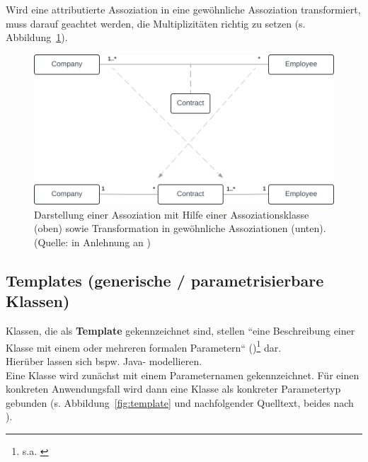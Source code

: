 \noindent
Wird eine attributierte Assoziation in eine gewöhnliche Assoziation transformiert, muss darauf geachtet werden, die Multiplizitäten richtig zu setzen (s. Abbildung~\ref{fig:assoziationsklasse}).

\begin{figure}
    \centering
    \includegraphics[scale=0.4]{part three/Klassendiagramme - Erweiterte Konzepte und Paketdiagramme/img/assoziationsklasse}
    \caption{Darstellung einer Assoziation mit Hilfe einer Assoziationsklasse (oben) sowie Transformation in gewöhnliche Assoziationen (unten). (Quelle: in Anlehnung an \cite[279, Abb. 4.4-11]{Oes05})}
    \label{fig:assoziationsklasse}
\end{figure}

\subsection{Templates (generische / parametrisierbare Klassen)}
Klassen, die als \textbf{Template} gekennzeichnet sind, stellen ``eine Beschreibung einer Klasse mit einem oder mehreren formalen Parametern`` (\cite[253]{Bal05})\footnote{
s.a. \cite[103 ff.]{OMG17}
} dar.\\

\noindent
Hierüber lassen sich bspw. Java- modellieren.\\

\noindent
Eine Klasse wird zunächst mit einem Parameternamen gekennzeichnet.
Für einen konkreten Anwendungsfall wird dann eine Klasse als konkreter Parametertyp gebunden (s. Abbildung~\ref{fig:template} und nachfolgender Quelltext, beides nach \cite[81 f.]{Fow03b}).

